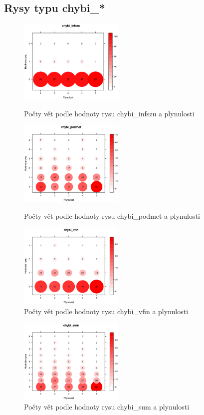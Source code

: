 \documentclass[12pt,a4paper]{report}
\begin{document}
\subsection{Rysy typu chybi\_*}
\begin{figure}[!htb]
  \centering\includegraphics[width=50mm]{./grafy/rysy/chybi_infszu-c.eps}
  \caption{Počty vět podle hodnoty rysu chybi\_infszu a plynulosti}\label{gr:infszu}
\endminipage\hfill
{}
  \centering\includegraphics[width=50mm]{./grafy/rysy/chybi_podmet-c.eps}
  \caption{Počty vět podle hodnoty rysu chybi\_podmet a plynulosti}\label{gr:podmet}
\endminipage\hfill
{}
  \centering\includegraphics[width=50mm]{./grafy/rysy/chybi_vfin-c.eps}
  \caption{Počty vět podle hodnoty rysu chybi\_vfin a plynulosti}\label{gr:vfin}
\endminipage\hfill
\end{figure}

\begin{figure}[!htb]
\centering{}
  \centering\includegraphics[width=50mm]{./grafy/rysy/chybi_sum-c.eps}
  \caption{Počty vět podle hodnoty rysu chybi\_sum a plynulosti}\label{gr:chybi}
\endminipage
\end{figure}
\end{document}
